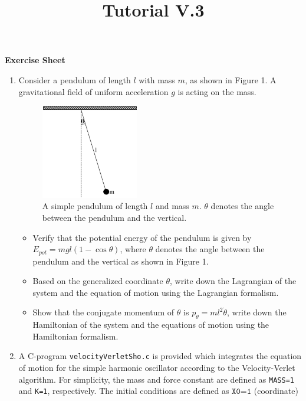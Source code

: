 \documentclass[a4paper,12pt]{article}
\makeatletter
\def\maketitle{%
  \begin{center}
    {\Large \bf Exercise Sheet \@title\par}%
    \vskip 0.5cm
    {\normalfont \@date\par}%
  \end{center}%
    \vskip 1.0cm
  }
\makeatother
\begin{document}
\title{{Tutorial V.3}}
\date{}
\maketitle


%
\renewcommand{\labelenumi}{\arabic{enumi}.}
%
%
%
\begin{enumerate}
\item Consider a pendulum of length $l$ with mass $m$, as shown in Figure 1.
A gravitational field of uniform acceleration $g$ is acting on the mass.
\begin{figure}[h!]
\vspace{1cm}
\centering
\includegraphics[width=0.4\textwidth]{pic}
\caption{A simple pendulum of length $l$ and mass $m$. $\theta$ denotes the angle between the pendulum and the vertical.}
\end{figure}
\begin{itemize}
\item Verify that the potential energy of the pendulum is given by $E_{\mathit pot} =   m g l ( 1 - \cos \theta)$, where $\theta$ denotes the angle between the pendulum and the vertical as shown in Figure 1. 
\item Based on the  generalized coordinate $\theta$, write down the
Lagrangian of the system and the equation of motion using the Lagrangian formalism.
\item Show that the
conjugate momentum of $\theta$ is $p_{\theta}=ml^2\dot{\theta}$, 
write down the
Hamiltonian of the system and the equations of motion using the Hamiltonian formalism.
\end{itemize}
\item A C-program \texttt{velocityVerletSho.c} is provided which integrates
the equation of motion for the simple harmonic oscillator according to the Velocity-Verlet algorithm. For simplicity, the mass and force constant are defined
as  \texttt{MASS=1} and \texttt{K=1}, respectively. The initial conditions are defined as $\texttt{X0=1}$ (coordinate)

\end{enumerate}
\end{document}
